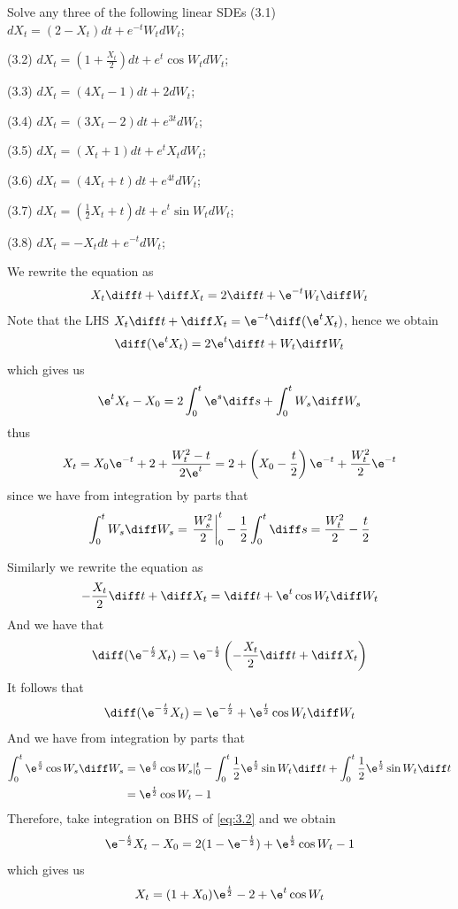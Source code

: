     \problem
    \begin{question}
        Solve any three of the following linear SDEs
        (3.1) $dX_t=(2-X_t)dt+e^{-t}W_tdW_t$;

        (3.2) $dX_t=(1+\frac{X_t}{2})dt+e^t\cos W_tdW_t$;

        (3.3) $dX_t=(4X_t-1)dt+2dW_t$;

        (3.4) $dX_t=(3X_t-2)dt+e^{3t}dW_t$;

        (3.5) $dX_t=(X_t+1)dt+e^t X_tdW_t$;

        (3.6) $dX_t=(4X_t+t)dt+e^{4t}dW_t$;

        (3.7) $dX_t=(\frac{1}{2}X_t+t)dt+e^t\sin W_tdW_t$;

        (3.8) $dX_t=-X_tdt+e^{-t}dW_t$;
    \end{question}
    \begin{subproblem}[(3.\arabic*)]
        \item
        We rewrite the equation as
        \[X_t\diff t+\diff X_t=2\diff t+\e^{-t}W_t\diff W_t\]
        Note that the LHS $X_t\diff t+\diff X_t=\e^{-t}\diff (\e^tX_t)$,
        hence we obtain
        \[\diff (\e^t X_t)=2\e^t\diff t+W_t\diff W_t\]
        which gives us
        \[\e^tX_t-X_0=2\int_0^t\e^s\diff s+\int_0^tW_s\diff W_s\]
        thus
        \[X_t=X_0\e^{-t}+2+\frac{W_t^2-t}{2\e^t}
        =2+\left(X_0-\frac{t}{2}\right)\e^{-t}+\frac{W_t^2}{2}\e^{-t}\]
        since we have from integration by parts that
        \[\int_0^tW_s\diff W_s=\left.\frac{W_s^2}{2}\right|_0^t
        -\frac{1}{2}\int_0^t\diff s=\frac{W_t^2}{2}-\frac{t}{2}\]
       
        \item
        Similarly we rewrite the equation as
        \[-\frac{X_t}{2}\diff t+\diff X_t=\diff t+\e^t\cos W_t\diff W_t\]
        And we have that
        \[\diff(\e^{-\frac{t}{2}}X_t)
        =\e^{-\frac{t}{2}}\left(-\frac{X_t}{2}\diff t+\diff X_t\right)\]
        It follows that
        \begin{equation}
            \label{eq:3.2}    
            \diff (\e^{-\frac{t}{2}}X_t)=\e^{-\frac{t}{2}}+\e^{\frac{t}{2}}\cos W_t\diff W_t
        \end{equation}
        And we have from integration by parts that
        \[\begin{aligned}
            \int_0^t\e^{\frac{s}{2}}\cos W_s\diff W_s
            &=\e^{\frac{s}{2}}\cos W_s|_0^t
            -\int_0^t\frac{1}{2}\e^{\frac{t}{2}}\sin W_t\diff t
            +\int_0^t\frac{1}{2}\e^{\frac{t}{2}}\sin W_t\diff t\\
            &=\e^{\frac{t}{2}}\cos W_t-1
        \end{aligned}\]
        Therefore, take integration on BHS of \cref{eq:3.2} and we obtain
        \[\e^{-\frac{t}{2}}X_t-X_0=2(1-\e^{-\frac{t}{2}})+\e^{\frac{t}{2}}\cos W_t-1\]
        which gives us
        \[X_t=(1+X_0)\e^{\frac{t}{2}}-2+\e^t\cos W_t\]
        

\end{subproblem}
